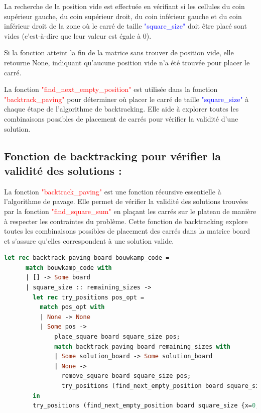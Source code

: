 \documentclass{article}
\begin{document}
La recherche de la position vide est effectuée en vérifiant si les cellules du coin supérieur gauche, du coin supérieur droit, du coin inférieur gauche et du coin inférieur droit de la zone où le carré de taille \textcolor{blue}{"square\_size"} doit être placé sont vides (c'est-à-dire que leur valeur est égale à 0).\newline

Si la fonction atteint la fin de la matrice sans trouver de position vide, elle retourne None, indiquant qu'aucune position vide n'a été trouvée pour placer le carré.\newline

La fonction \textcolor{red}{"find\_next\_empty\_position"} est utilisée dans la fonction \textcolor{red}{"backtrack\_paving"} pour déterminer où placer le carré de taille \textcolor{blue}{"square\_size"} à chaque étape de l'algorithme de backtracking. Elle aide à explorer toutes les combinaisons possibles de placement de carrés pour vérifier la validité d'une solution.

\subsection{ Fonction de backtracking pour vérifier la validité des solutions :}

La fonction \textcolor{red}{"backtrack\_paving"} est une fonction récursive essentielle à l'algorithme de pavage. Elle permet de vérifier la validité des solutions trouvées par la fonction \textcolor{red}{"find\_square\_sum"} en plaçant les carrés sur le plateau de manière à respecter les contraintes du problème. Cette fonction de backtracking explore toutes les combinaisons possibles de placement des carrés dans la matrice board et s'assure qu'elles correspondent à une solution valide.\newline

\begin{lstlisting}[language=Caml]
let rec backtrack_paving board bouwkamp_code =
      match bouwkamp_code with
      | [] -> Some board
      | square_size :: remaining_sizes ->
        let rec try_positions pos_opt =
          match pos_opt with
          | None -> None
          | Some pos ->
              place_square board square_size pos;
              match backtrack_paving board remaining_sizes with
              | Some solution_board -> Some solution_board
              | None ->
                remove_square board square_size pos;
                try_positions (find_next_empty_position board square_size {x=pos.x+1; y=pos.y})
        in
        try_positions (find_next_empty_position board square_size {x=0; y=0});;
\end{lstlisting}
\end{document}
